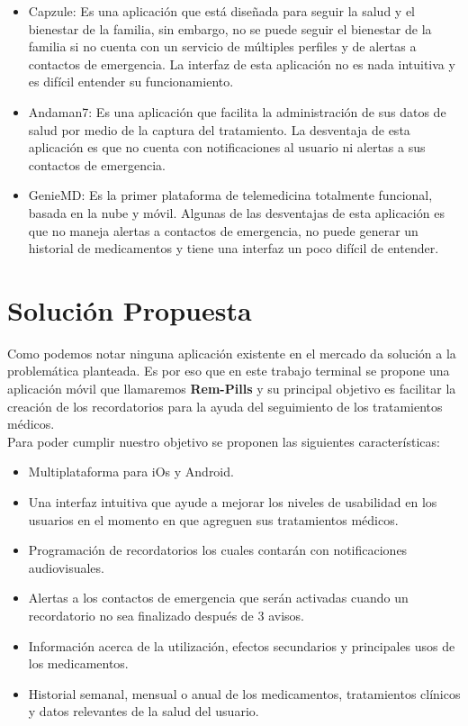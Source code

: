 \begin{itemize}
	\item Capzule: Es una aplicación que está diseñada para seguir la salud y el bienestar de la familia, sin embargo, no se puede seguir el bienestar de la familia si no cuenta con un servicio de múltiples perfiles y de alertas a contactos de emergencia. La interfaz de esta aplicación no es nada intuitiva y es difícil entender su funcionamiento.

	\item Andaman7: Es una aplicación que facilita la administración de sus datos de salud por medio de la captura del tratamiento. La desventaja de esta aplicación es que no cuenta con notificaciones al usuario ni alertas a sus contactos de emergencia. 
	
	\item GenieMD: Es la primer plataforma de telemedicina totalmente funcional, basada en la nube y móvil. Algunas de las desventajas de esta aplicación es que no maneja alertas a contactos de emergencia, no puede generar un historial de medicamentos y tiene una interfaz un poco difícil de entender.
	
\end{itemize}

	
\section{Solución Propuesta}
Como podemos notar ninguna aplicación existente en el mercado da solución a la problemática planteada.
Es por eso que en este trabajo terminal se propone una aplicación móvil que llamaremos \textbf{Rem-Pills} y su principal objetivo es facilitar la creación de los recordatorios para la ayuda del seguimiento de los tratamientos médicos.\\
Para poder cumplir nuestro objetivo se proponen las siguientes características:
\begin{itemize}
	\item Multiplataforma para iOs y Android.
	
	\item Una interfaz intuitiva que ayude a mejorar los niveles de usabilidad en los usuarios en el momento en que agreguen sus tratamientos médicos.
	
	\item Programación de recordatorios los cuales contarán con notificaciones audiovisuales.
	
	\item Alertas a los contactos de emergencia que serán activadas cuando un recordatorio no sea finalizado después de 3 avisos.
	
	\item Información acerca de la utilización, efectos secundarios y principales usos de los medicamentos.
	
	\item Historial semanal, mensual o anual de los medicamentos, tratamientos clínicos y datos relevantes de la salud del usuario.
	
\end{itemize}



